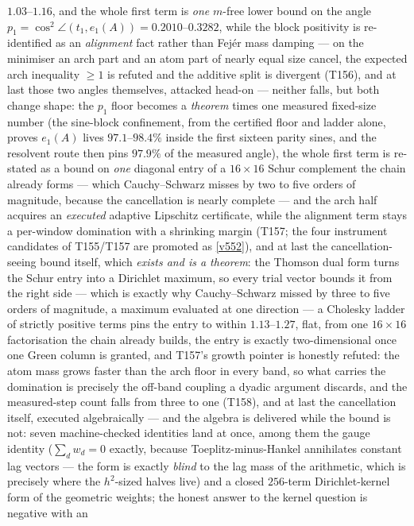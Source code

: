 \documentclass[11pt,a4paper]{article}
\begin{document}
$1.03$--$1.16$, and the whole first term is \emph{one} $m$-free lower bound on the angle
$p_1=\cos^2\angle(t_1,e_1(A))=0.2010$--$0.3282$, while the block positivity is
re-identified as an \emph{alignment} fact rather than Fej\'er mass damping --- on the
minimiser an arch part and an atom part of nearly equal size cancel, the expected arch
inequality $\ge1$ is refuted and the additive split is divergent (T156), and at last those
two angles themselves, attacked head-on --- neither falls, but both change shape: the
$p_1$ floor becomes a \emph{theorem} times one measured fixed-size number (the sine-block
confinement, from the certified floor and ladder alone, proves $e_1(A)$ lives
$97.1$--$98.4\%$ inside the first sixteen parity sines, and the resolvent route then pins
$97.9\%$ of the measured angle), the whole first term is re-stated as a bound on
\emph{one} diagonal entry of a $16\times16$ Schur complement the chain already forms ---
which Cauchy--Schwarz misses by two to five orders of magnitude, because the cancellation
is nearly complete --- and the arch half acquires an \emph{executed} adaptive Lipschitz
certificate, while the alignment term stays a per-window domination with a shrinking
margin (T157; the four instrument candidates of T155/T157 are promoted as \vref{v552}), and at
last the cancellation-seeing bound itself, which \emph{exists and is a theorem}: the Thomson
dual form turns the Schur entry into a Dirichlet maximum, so every trial vector bounds it from
the right side --- which is exactly why Cauchy--Schwarz missed by three to five orders of
magnitude, a maximum evaluated at one direction --- a Cholesky ladder of strictly positive
terms pins the entry to within $1.13$--$1.27$, flat, from one $16\times16$ factorisation the
chain already builds, the entry is exactly two-dimensional once one Green column is granted,
and T157's growth pointer is honestly refuted: the atom mass grows faster than the arch floor
in every band, so what carries the domination is precisely the off-band coupling a dyadic
argument discards, and the measured-step count falls from three to one (T158), and at
last the cancellation itself, executed algebraically --- and the algebra is delivered while
the bound is not: seven machine-checked identities land at once, among them the gauge
identity ($\sum_d w_d=0$ exactly, because Toeplitz-minus-Hankel annihilates constant lag
vectors --- the form is exactly \emph{blind} to the lag mass of the arithmetic, which is
precisely where the $h^2$-sized halves live) and a closed $256$-term Dirichlet-kernel form
of the geometric weights; the honest answer to the kernel question is negative with an
\end{document}
